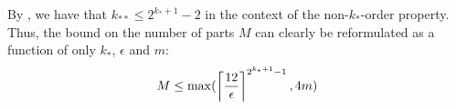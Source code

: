         \begin{remark}
            By , we have that $k_{**} \leq 2^{k_* + 1}-2$ in the context of the non-$k_*$-order
            property.
            Thus, the bound on the number of parts $M$ can clearly be reformulated as a function of only $k_*$, $\epsilon$ and $m$:
            \[
                M \leq \max ( \left\lceil \frac{12}{\epsilon} \right\rceil^{2^{k_* + 1}-1}, 4m )
            \]
        \end{remark}




